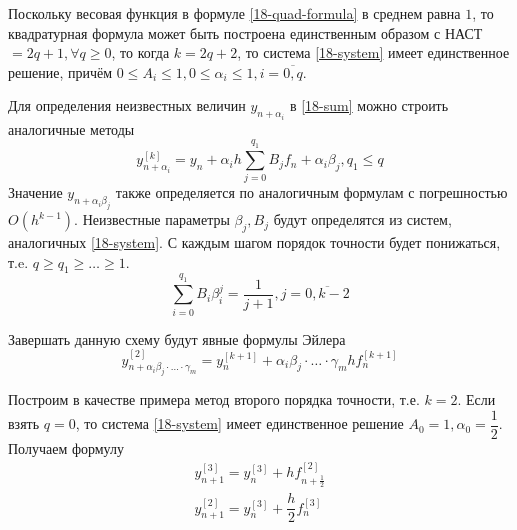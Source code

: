 Поскольку весовая функция в формуле \eqref{18-quad-formula} в среднем равна $1$,
то квадратурная формула может быть построена единственным образом с НАСТ
$= 2q + 1, \forall q \geqslant 0$, то когда $k = 2q + 2$, то система
\eqref{18-system} имеет единственное решение, причём $0 \leqslant A_i \leqslant 1,
0 \leqslant \alpha_i \leqslant 1, i = \overline{0, q}$.

Для определения неизвестных величин $y_{n + \alpha_i}$ в \eqref{18-sum} можно
строить аналогичные методы
\begin{equation}
  y_{n + \alpha_i}^{[k]} = y_n + \alpha_i h\sum\limits_{j = 0}^{q_1}B_jf_n +
  \alpha_i\beta_j, q_1 \leqslant q
\end{equation}
Значение $y_{n + \alpha_i\beta_j}$ также определяется по аналогичным формулам
с погрешностью $O(h^{k - 1})$. Неизвестные параметры $\beta_j, B_j$ будут
определятся из систем, аналогичных \eqref{18-system}. С каждым шагом порядок
точности будет понижаться, т.e. $q \geqslant q_1 \geqslant \ldots \geqslant 1$.
\begin{equation}
  \sum\limits_{i = 0}^{q_1}B_i\beta_i^j = \dfrac{1}{j + 1}, j = \overline{0, k - 2}
\end{equation}

Завершать данную схему будут явные формулы Эйлера
\begin{equation}
  y_{n + \alpha_i\beta_j\cdot\ldots\cdot\gamma_m}^{[2]} = y_n^{[k + 1]} +
  \alpha_i\beta_j\cdot\ldots\cdot\gamma_m hf_n^{[k + 1]}
\end{equation}

Построим в качестве примера метод второго порядка точности, т.е. $k = 2$. Если
взять $q = 0$, то система \eqref{18-system} имеет единственное решение
$A_0 = 1, \alpha_0 = \dfrac{1}{2}$. Получаем формулу
\begin{align}
  y_{n + 1}^{[3]} = y_n^{[3]} + hf_{n + \frac{1}{2}}^{[2]}\\
  y_{n + 1}^{[2]} = y_n^{[3]} + \dfrac{h}{2}f_n^{[3]}\\
\end{align}
